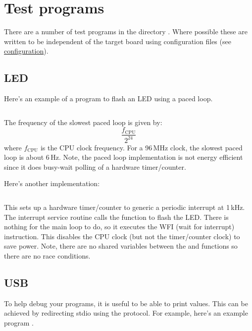 \chapter{Test programs}
\label{test-programs}

There are a number of test programs in the directory
.  Where possible these are written to be
independent of the target board using configuration files (see
\protect\hyperref[configuration]{configuration}).

\section{LED}
\label{led-interfacing}

Here's an example of a program to flash an LED using a paced loop.

\inputminted{C}{../../src/test-apps/ledflash1/ledflash1.c}

The frequency of the slowest paced loop is given by:
%
\begin{displaymath}
  \frac{f_{\mathrm{CPU}}}{2^{24}}
\end{displaymath}
%
where $f_{\mathrm{CPU}}$ is the CPU clock frequency.  For a 96\,MHz
clock, the slowest paced loop is about 6\,Hz.  Note, the paced loop
implementation is not energy efficient since it does busy-wait polling
of a hardware timer/counter.

Here's another implementation:

\inputminted{C}{../../src/test-apps/ledflash2/ledflash2.c}

This sets up a hardware timer/counter to generic a periodic interrupt
at 1\,kHz.  The interrupt service routine calls the function
 to flash the LED.  There is nothing for the main loop
to do, so it executes the WFI (wait for interrupt) instruction.  This
disables the CPU clock (but not the timer/counter clock) to save
power.  Note, there are no shared variables between the 
and  functions so there are no race conditions.


\section{USB}
\label{usb-interfacing}

To help debug your programs, it is useful to be able to print values.
This can be achieved by redirecting stdio using the  protocol.  For example, here's an example program
.

